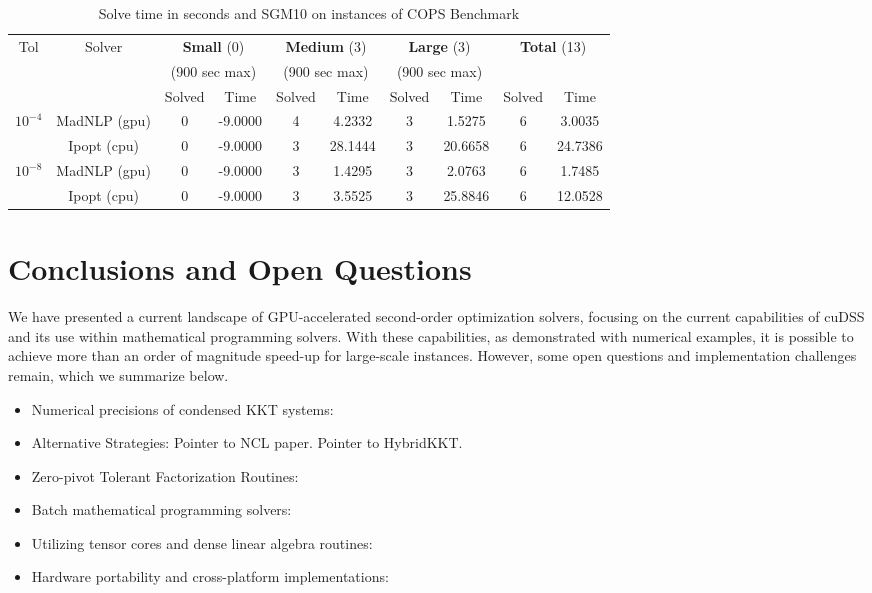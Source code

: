 \documentclass{article}
\begin{document}
\begin{table}[t]
  \centering\footnotesize
  \caption{Solve time in seconds and SGM10 on instances of COPS Benchmark}\label{tab:cops}
\begin{tabular}{|c|c|cc|cc|cc|cc|}
  \hline
  \multirow{ 3}{*}{Tol} & \multirow{ 3}{*}{Solver} & \multicolumn{2}{c|}{\textbf{Small} (0)}& \multicolumn{2}{c|}{\textbf{Medium} (3)}& \multicolumn{2}{c|}{\textbf{Large} (3)}& \multicolumn{2}{c|}{\multirow{2}{*}{\textbf{Total} (13)}}\\
                        && \multicolumn{2}{c|}{(900 sec max)}& \multicolumn{2}{c|}{(900 sec max)}& \multicolumn{2}{c|}{(900 sec max)}&&\\
                        &&  Solved & Time &  Solved & Time &  Solved & Time &  Solved & Time \\
  \hline
    \multirow{2}{*}{$10^{-4}$} & MadNLP (gpu) & 0 & -9.0000 & 4 & 4.2332 & 3 & 1.5275 & 6 & 3.0035  \\
                        & Ipopt (cpu) & 0 & -9.0000 & 3 & 28.1444 & 3 & 20.6658 & 6 & 24.7386  \\

  \hline
    \multirow{2}{*}{$10^{-8}$} & MadNLP (gpu) & 0 & -9.0000 & 3 & 1.4295 & 3 & 2.0763 & 6 & 1.7485  \\
                        & Ipopt (cpu) & 0 & -9.0000 & 3 & 3.5525 & 3 & 25.8846 & 6 & 12.0528  \\

  \hline
\end{tabular}
\end{table}


\section{Conclusions and Open Questions}
We have presented a current landscape of GPU-accelerated second-order optimization solvers, focusing on the current capabilities of cuDSS and its use within mathematical programming solvers. With these capabilities, as demonstrated with numerical examples, it is possible to achieve more than an order of magnitude speed-up for large-scale instances. However, some open questions and implementation challenges remain, which we summarize below.
\begin{itemize}[leftmargin=*,itemsep=0pt,parsep=0pt,partopsep=0pt]
\item {Numerical precisions of condensed KKT systems}:
\item {Alternative Strategies}:
Pointer to NCL paper.
Pointer to HybridKKT.
\item {Zero-pivot Tolerant Factorization Routines}:
\item {Batch mathematical programming solvers}:
\item {Utilizing tensor cores and dense linear algebra routines}:
\item {Hardware portability and cross-platform implementations}:
\end{itemize}
\end{document}

